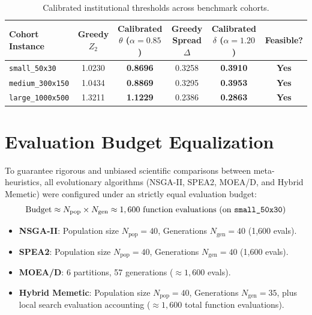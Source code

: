 \begin{table}[htbp]
    \centering
    \caption{Calibrated institutional thresholds across benchmark cohorts.}
    \label{tab:calibration}
    \begin{tabularx}{\textwidth}{lccccc}
        \toprule
        \textbf{Cohort Instance} & \textbf{Greedy $Z_2$} & \textbf{Calibrated $\theta$ ($\alpha=0.85$)} & \textbf{Greedy Spread $\Delta$} & \textbf{Calibrated $\delta$ ($\alpha=1.20$)} & \textbf{Feasible?} \\
        \midrule
        \texttt{small\_50x30} & 1.0230 & \textbf{0.8696} & 0.3258 & \textbf{0.3910} & \textbf{Yes} \\
        \texttt{medium\_300x150} & 1.0434 & \textbf{0.8869} & 0.3295 & \textbf{0.3953} & \textbf{Yes} \\
        \texttt{large\_1000x500} & 1.3211 & \textbf{1.1229} & 0.2386 & \textbf{0.2863} & \textbf{Yes} \\
        \bottomrule
    \end{tabularx}
\end{table}

\section{Evaluation Budget Equalization}
To guarantee rigorous and unbiased scientific comparisons between meta-heuristics, all evolutionary algorithms (NSGA-II, SPEA2, MOEA/D, and Hybrid Memetic) were configured under an strictly equal evaluation budget:
\begin{equation}
    \text{Budget} \approx N_{\text{pop}} \times N_{\text{gen}} \approx 1,600 \text{ function evaluations (on \texttt{small\_50x30})}
\end{equation}
\begin{itemize}
    \item \textbf{NSGA-II}: Population size $N_{\text{pop}} = 40$, Generations $N_{\text{gen}} = 40$ (1,600 evals).
    \item \textbf{SPEA2}: Population size $N_{\text{pop}} = 40$, Generations $N_{\text{gen}} = 40$ (1,600 evals).
    \item \textbf{MOEA/D}: 6 partitions, 57 generations ($\approx 1,600$ evals).
    \item \textbf{Hybrid Memetic}: Population size $N_{\text{pop}} = 40$, Generations $N_{\text{gen}} = 35$, plus local search evaluation accounting ($\approx 1,600$ total function evaluations).
\end{itemize}

